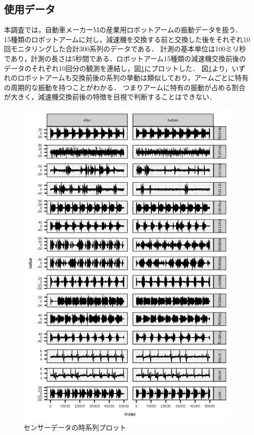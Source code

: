 \documentclass{jarticle}
\begin{document}
\subsection{使用データ}
本調査では，自動車メーカーMの産業用ロボットアームの振動データを扱う．
15種類のロボットアームに対し，減速機を交換する前と交換した後をそれぞれ10回モニタリングした合計300系列のデータである．
計測の基本単位は100ミリ秒であり，計測の長さは5秒間である．ロボットアーム15種類の減速機交換前後のデータのそれぞれ10回分の観測を連結し，図\ref{fig:ts}にプロットした．
図\ref{fig:ts}より，いずれのロボットアームも交換前後の系列の挙動は類似しており，アームごとに特有の周期的な振動を持つことがわかる．
つまりアームに特有の振動が占める割合が大きく，減速機交換前後の特徴を目視で判断することはできない．
\begin{figure}[H]
\begin{center}
	\includegraphics[width=12cm]{fig/ts.png}	
	\caption{センサーデータの時系列プロット\label{fig:ts}}
\end{center}
\end{figure}
\end{document}
